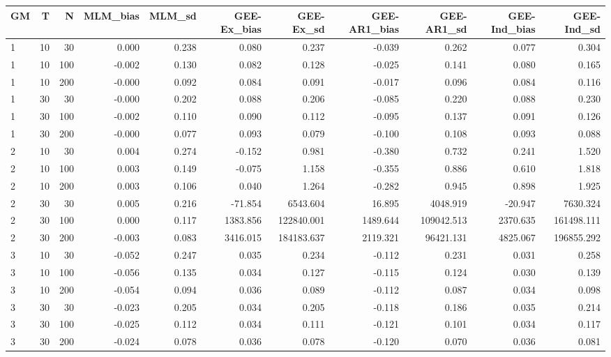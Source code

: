 \begin{table}[ht]
\centering
\begin{tabular}{lrrrrrrrrrr}
  \hline
GM & T & N & MLM\_bias & MLM\_sd & GEE-Ex\_bias & GEE-Ex\_sd & GEE-AR1\_bias & GEE-AR1\_sd & GEE-Ind\_bias & GEE-Ind\_sd \\ 
  \hline
1 & 10 & 30 & 0.000 & 0.238 & 0.080 & 0.237 & -0.039 & 0.262 & 0.077 & 0.304 \\ 
  1 & 10 & 100 & -0.002 & 0.130 & 0.082 & 0.128 & -0.025 & 0.141 & 0.080 & 0.165 \\ 
  1 & 10 & 200 & -0.000 & 0.092 & 0.084 & 0.091 & -0.017 & 0.096 & 0.084 & 0.116 \\ 
  1 & 30 & 30 & -0.000 & 0.202 & 0.088 & 0.206 & -0.085 & 0.220 & 0.088 & 0.230 \\ 
  1 & 30 & 100 & -0.002 & 0.110 & 0.090 & 0.112 & -0.095 & 0.137 & 0.091 & 0.126 \\ 
  1 & 30 & 200 & -0.000 & 0.077 & 0.093 & 0.079 & -0.100 & 0.108 & 0.093 & 0.088 \\ 
  2 & 10 & 30 & 0.004 & 0.274 & -0.152 & 0.981 & -0.380 & 0.732 & 0.241 & 1.520 \\ 
  2 & 10 & 100 & 0.003 & 0.149 & -0.075 & 1.158 & -0.355 & 0.886 & 0.610 & 1.818 \\ 
  2 & 10 & 200 & 0.003 & 0.106 & 0.040 & 1.264 & -0.282 & 0.945 & 0.898 & 1.925 \\ 
  2 & 30 & 30 & 0.005 & 0.216 & -71.854 & 6543.604 & 16.895 & 4048.919 & -20.947 & 7630.324 \\ 
  2 & 30 & 100 & 0.000 & 0.117 & 1383.856 & 122840.001 & 1489.644 & 109042.513 & 2370.635 & 161498.111 \\ 
  2 & 30 & 200 & -0.003 & 0.083 & 3416.015 & 184183.637 & 2119.321 & 96421.131 & 4825.067 & 196855.292 \\ 
  3 & 10 & 30 & -0.052 & 0.247 & 0.035 & 0.234 & -0.112 & 0.231 & 0.031 & 0.258 \\ 
  3 & 10 & 100 & -0.056 & 0.135 & 0.034 & 0.127 & -0.115 & 0.124 & 0.030 & 0.139 \\ 
  3 & 10 & 200 & -0.054 & 0.094 & 0.036 & 0.089 & -0.112 & 0.087 & 0.034 & 0.098 \\ 
  3 & 30 & 30 & -0.023 & 0.205 & 0.034 & 0.205 & -0.118 & 0.186 & 0.035 & 0.214 \\ 
  3 & 30 & 100 & -0.025 & 0.112 & 0.034 & 0.111 & -0.121 & 0.101 & 0.034 & 0.117 \\ 
  3 & 30 & 200 & -0.024 & 0.078 & 0.036 & 0.078 & -0.120 & 0.070 & 0.036 & 0.081 \\ 

\end{tabular}
\end{table}
